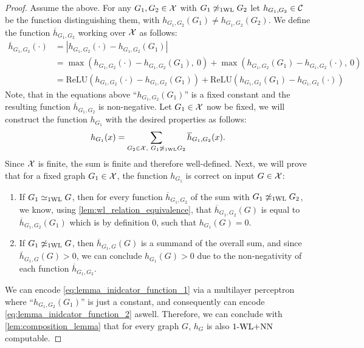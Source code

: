 \begin{proof}
    Assume the above. For any $G_1, G_2 \in \mathcal{X}$ with $G_1 \not\simeq_{\text{1WL}} G_2$ let $h_{G_1, G_2} \in \mathcal{C}$ be the function distinguishing them, with $h_{G_1, G_2}(G_1) \neq h_{G_1, G_2}(G_2)$. We define the function $\overline{h}_{G_1,G_2}$ working over $\mathcal{X}$ as follows:
    \begin{align}\label{eq:lemma_inidcator_function_1}
        \overline{h}_{G_1, G_2}(\cdot) &= |h_{G_1, G_2}(\cdot) - h_{G_1, G_2}(G_1)| \nonumber\\
        &= \max(h_{G_1, G_2}(\cdot) - h_{G_1, G_2}(G_1), \ 0) + \max(h_{G_1, G_2}(G_1) - h_{G_1, G_2}(\cdot), \ 0) \nonumber\\
        &= \text{ReLU}(h_{G_1, G_2}(\cdot) - h_{G_1, G_2}(G_1)) + \text{ReLU}(h_{G_1, G_2}(G_1) - h_{G_1, G_2}(\cdot))
    \end{align}
    Note, that in the equations above ``$h_{G_1, G_2}(G_1)$'' is a fixed constant and the resulting function $\overline{h}_{G_1, G_2}$ is non-negative.
    Let $G_1 \in \mathcal{X}$ now be fixed, we will construct the function $h_{G_1}$ with the desired properties as follows:
    \begin{align}\label{eq:lemma_inidcator_function_2}
        h_{G_1}(x) = \sum_{G_2 \in \mathcal{X}, \ G_1 \not\simeq_{\text{1WL}} G_2} \overline{h}_{G_1, G_2}(x).
    \end{align}
    Since $\mathcal{X}$ is finite, the sum is finite and therefore well-defined. Next, we will prove that for a fixed graph $G_1 \in \mathcal{X}$, the function $h_{G_1}$ is correct on input $G \in \mathcal{X}$:
    \begin{enumerate}
        \item If $G_1 \simeq_{\text{1WL}} G$, then for every function $\overline{h}_{G_1, G_2}$ of the sum with $G_1 \not\simeq_{\text{1WL}} G_2$, we know, using \autoref{lem:wl_relation_equivalence}, that $\overline{h}_{G_1, G_2}(G)$ is equal to $\overline{h}_{G_1, G_2}(G_1)$ which is by definition $0$, such that $h_{G_1}(G) = 0$.
        \item If $G_1 \not\simeq_{\text{1WL}} G$, then $\overline{h}_{G_1, G}(G)$ is a summand of the overall sum, and since $\overline{h}_{G_1, G}(G) > 0$, 
        we can conclude $h_{G_1}(G) > 0$ due to the non-negativity of each function $\overline{h}_{G_1, G_2}$.
    \end{enumerate}
    We can encode \autoref{eq:lemma_inidcator_function_1} via a multilayer perceptron where ``$h_{G_1, G_2}(G_1)$'' is just a constant, and consequently can encode \autoref{eq:lemma_inidcator_function_2} aswell. Therefore, we can conclude with \autoref{lem:composition_lemma} that for every graph $G$, $h_G$ is also $\text{1-WL+NN}$ computable.
\end{proof}

